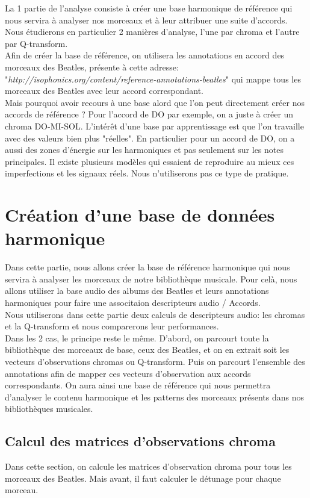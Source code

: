 \documentclass[12pt,a4paper]{article}
\begin{document}
La 1 partie de l'analyse consiste à créer une base harmonique de référence qui nous servira à analyser nos morceaux et à leur attribuer une suite d'accords. Nous étudierons en particulier 2 manières d'analyse, l'une par chroma et l'autre par Q-transform.
\\Afin de créer la base de référence, on utilisera les annotations en accord des morceaux des Beatles, présente à cette adresse: "\textit{http://isophonics.org/content/reference-annotations-beatles}" qui mappe tous les morceaux des Beatles avec leur accord correspondant.
\\Mais pourquoi avoir recours à une base alord que l'on peut directement créer nos accords de référence ? Pour l'accord de DO par exemple, on a juste à créer un chroma DO-MI-SOL. L'intérêt d'une base par apprentissage est que l'on travaille avec des valeurs bien plus "réelles". En particulier pour un accord de DO, on a aussi des zones d'énergie sur les harmoniques et pas seulement sur les notes principales. Il existe plusieurs modèles qui essaient de reproduire au mieux ces imperfections et les signaux réels. Nous n'utiliserons pas ce type de pratique.

\section{Création d'une base de données harmonique}
Dans cette partie, nous allons créer la base de référence harmonique qui nous servira à analyser les morceaux de notre bibliothèque musicale. Pour celà, nous allons utiliser la base audio des albums des Beatles et leurs annotations harmoniques pour faire une associtaion descripteurs audio / Accords.
\\Nous utiliserons dans cette partie deux calculs de descripteurs audio: les chromas et la Q-transform et nous comparerons leur performances.
\\Dans les 2 cas, le principe reste le même. D'abord, on parcourt toute la bibliothèque des morceaux de base, ceux des Beatles, et on en extrait soit les vecteurs d'observations chromas ou Q-transform. Puis on parcourt l'ensemble des annotations afin de mapper ces vecteurs d'observation aux accords correspondants. On aura ainsi une base de référence qui nous permettra d'analyser le contenu harmonique et les patterns des morceaux présents dans nos bibliothèques musicales.

\subsection{Calcul des matrices d'observations chroma}
Dans cette section, on calcule les matrices d'observation chroma pour tous les morceaux des Beatles. Mais avant, il faut calculer le détunage pour chaque morceau.
\end{document}
